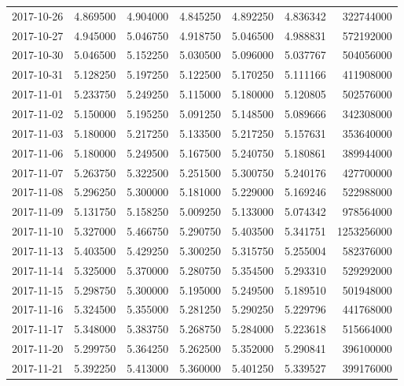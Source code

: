 \begin{tabular}{lrrrrrr}
2017-10-26 &    4.869500 &    4.904000 &    4.845250 &    4.892250 &    4.836342 &   322744000 \\
2017-10-27 &    4.945000 &    5.046750 &    4.918750 &    5.046500 &    4.988831 &   572192000 \\
2017-10-30 &    5.046500 &    5.152250 &    5.030500 &    5.096000 &    5.037767 &   504056000 \\
2017-10-31 &    5.128250 &    5.197250 &    5.122500 &    5.170250 &    5.111166 &   411908000 \\
2017-11-01 &    5.233750 &    5.249250 &    5.115000 &    5.180000 &    5.120805 &   502576000 \\
2017-11-02 &    5.150000 &    5.195250 &    5.091250 &    5.148500 &    5.089666 &   342308000 \\
2017-11-03 &    5.180000 &    5.217250 &    5.133500 &    5.217250 &    5.157631 &   353640000 \\
2017-11-06 &    5.180000 &    5.249500 &    5.167500 &    5.240750 &    5.180861 &   389944000 \\
2017-11-07 &    5.263750 &    5.322500 &    5.251500 &    5.300750 &    5.240176 &   427700000 \\
2017-11-08 &    5.296250 &    5.300000 &    5.181000 &    5.229000 &    5.169246 &   522988000 \\
2017-11-09 &    5.131750 &    5.158250 &    5.009250 &    5.133000 &    5.074342 &   978564000 \\
2017-11-10 &    5.327000 &    5.466750 &    5.290750 &    5.403500 &    5.341751 &  1253256000 \\
2017-11-13 &    5.403500 &    5.429250 &    5.300250 &    5.315750 &    5.255004 &   582376000 \\
2017-11-14 &    5.325000 &    5.370000 &    5.280750 &    5.354500 &    5.293310 &   529292000 \\
2017-11-15 &    5.298750 &    5.300000 &    5.195000 &    5.249500 &    5.189510 &   501948000 \\
2017-11-16 &    5.324500 &    5.355000 &    5.281250 &    5.290250 &    5.229796 &   441768000 \\
2017-11-17 &    5.348000 &    5.383750 &    5.268750 &    5.284000 &    5.223618 &   515664000 \\
2017-11-20 &    5.299750 &    5.364250 &    5.262500 &    5.352000 &    5.290841 &   396100000 \\
2017-11-21 &    5.392250 &    5.413000 &    5.360000 &    5.401250 &    5.339527 &   399176000 \\

\end{tabular}
